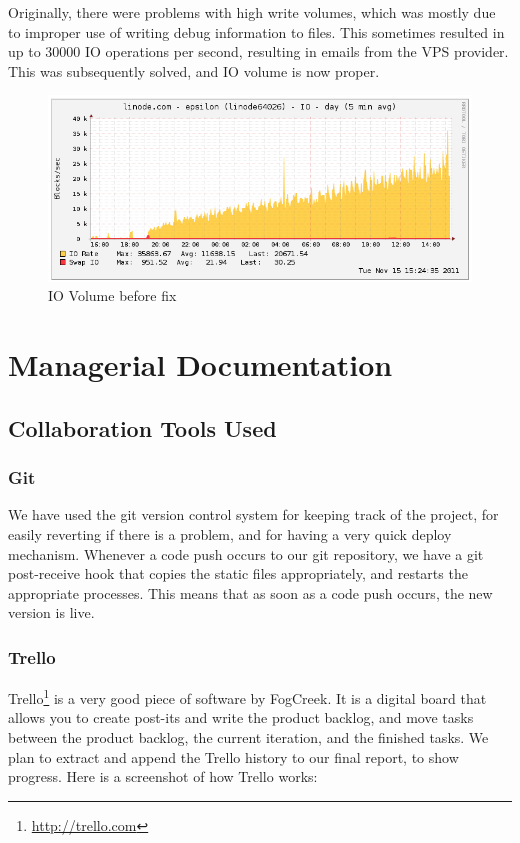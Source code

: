 \documentclass[a4paper,12pt]{article}
\begin{document}
		Originally, there were problems with high write volumes, which was mostly due to improper use of writing debug information to files. This sometimes resulted in up to 30000 IO operations per second, resulting in emails from the VPS provider. This was subsequently solved, and IO volume is now proper.
	
		\begin{figure}[ht!]
					\centering
						\includegraphics[scale=0.4]{io_chart.png}
					\caption{IO Volume before fix}
		\end{figure}
	
	
	\section{Managerial Documentation}
	
		\subsection{Collaboration Tools Used}
		
			\subsubsection{Git}
			
			We have used the git version control system for keeping track of the project, for easily reverting if there is a problem, and for having a very quick deploy mechanism. Whenever a code push occurs to our git repository, we have a git post-receive hook that copies the static files appropriately, and restarts the appropriate processes. This means that as soon as a code push occurs, the new version is live.
			
			\subsubsection{Trello}
			
			Trello\footnote{\url{http://trello.com}} is a very good piece of software by FogCreek. It is a digital board that allows you to create post-its and write the product backlog, and move tasks between the product backlog, the current iteration, and the finished tasks. We plan to extract and append the Trello history to our final report, to show progress. Here is a screenshot of how Trello works:
			
\end{document}
